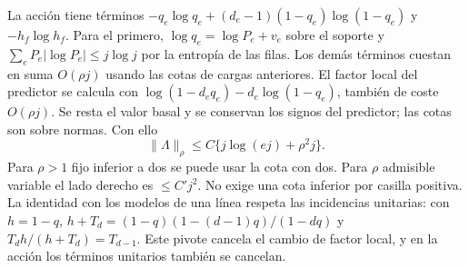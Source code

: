 La acción tiene términos $-q_e\log q_e+(d_e-1)(1-q_e)\log(1-q_e)$ y $-h_f\log h_f$.
Para el primero, $\log q_e=\log P_e+v_e$ sobre el soporte y
$\sum_e P_e|\log P_e|\le j\log j$ por la entropía de las filas.
Los demás términos cuestan en suma $O(\rho j)$ usando las cotas de cargas anteriores.
El factor local del predictor se calcula con $\log(1-d_e q_e)-d_e\log(1-q_e)$,
también de coste $O(\rho j)$. Se resta el valor basal y se conservan los signos del
predictor; las cotas son sobre normas. Con ello
\[
 \|\Lambda\|_\rho\le C\{j\log(ej)+\rho^2j\}.
\]
Para $\rho>1$ fijo inferior a dos se puede usar la cota con dos. Para $\rho$ admisible
variable el lado derecho es $\le C'j^2$. No exige una cota inferior por casilla positiva.
La identidad con los modelos de una línea respeta las incidencias unitarias: con $h=1-q$,
$h+T_d=(1-q)(1-(d-1)q)/(1-dq)$ y $T_d h/(h+T_d)=T_{d-1}$. Este pivote cancela
el cambio de factor local, y en la acción los términos unitarios también se cancelan.
